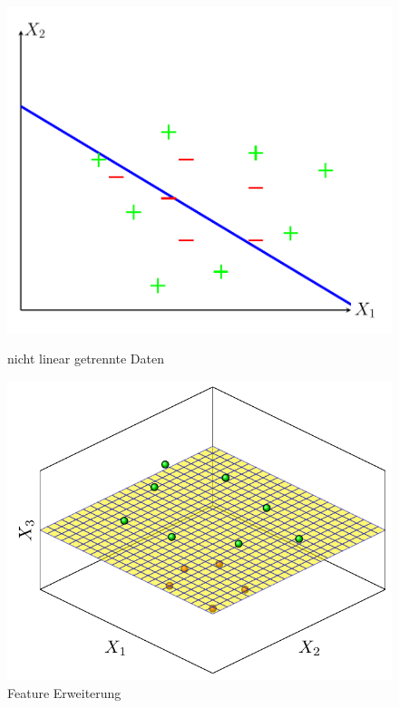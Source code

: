 \documentclass[
]{article}
\begin{document}
\begin{figure}[htb]
    \centering
    \begin{minipage}{0.45\textwidth} 
        \centering
        \includegraphics[width=\textwidth,trim=0.5cm 0.5cm 0.5cm 0.5cm]{Images/nonlinearseperable.pdf} 
        \caption{nicht linear getrennte Daten}
        \label{fig:nonlinearsep}
    \end{minipage}\hfill
    \begin{minipage}{0.45\textwidth} 
        \centering
        \includegraphics[width=\textwidth,trim=0.5cm 0.5cm 0.5cm 0.5cm]{Images/featurexpansion.pdf}
        \caption{Feature Erweiterung}
        \label{fig:featurexten}
    \end{minipage}
\end{figure}
\end{document}
